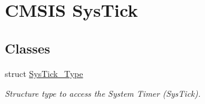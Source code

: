 \hypertarget{group___c_m_s_i_s___sys_tick}{\section{C\-M\-S\-I\-S Sys\-Tick}
\label{group___c_m_s_i_s___sys_tick}
}
\subsection*{Classes}
\begin{DoxyCompactItemize}
\item 
struct \hyperlink{struct_sys_tick___type}{Sys\-Tick\-\_\-\-Type}
\begin{DoxyCompactList}\small\item\em Structure type to access the System Timer (Sys\-Tick). \end{DoxyCompactList}\end{DoxyCompactItemize}
